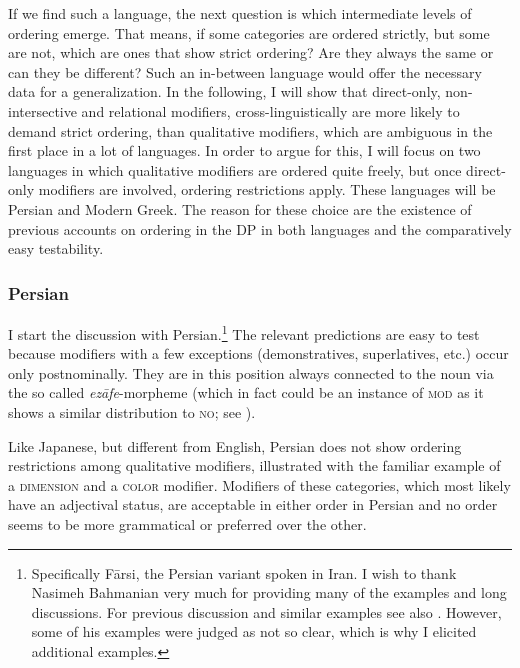 \documentclass [output=book,colorlinks,citecolor=brown]{langscibook}
\begin{document}
If we find such a language, the next question is which intermediate levels of ordering emerge. That means, if some categories are ordered strictly, but some are not, which are ones that show strict ordering? Are they always the same or can they be different? Such an in-between language would offer the necessary data for a generalization. In the following, I will show that direct-only, non-intersective and relational modifiers, cross-linguistically are more likely to demand strict ordering, than qualitative modifiers, which are ambiguous in the first place in a lot of languages. In order to argue for this, I will focus on two languages in which qualitative modifiers are ordered quite freely, but once direct-only modifiers are involved, ordering restrictions apply. These languages will be Persian and Modern Greek. The reason for these choice are the existence of previous accounts on ordering in the DP in both languages and the comparatively easy testability.

\subsubsection{Persian} \label{persiananalysis}

I start the discussion with Persian.\footnote{Specifically Fārsi, the Persian variant spoken in Iran. I wish to thank Nasimeh Bahmanian very much for providing many of the examples and long discussions. For previous discussion and similar examples see also \citet{kahne:2014:revisiting}. However, some of his examples were judged as not so clear, which is why I elicited additional examples.} The relevant predictions are easy to test because modifiers with a few exceptions (demonstratives, superlatives, etc.) occur only postnominally. They are in this position always connected to the noun via the so called \textit{ezāfe}-morpheme (which in fact could be an instance of \textsc{mod} as it shows a similar distribution to \textsc{no}; see \citealt{toosarvandani:2014:the, gn:2024:morpho}). %

Like Japanese, but different from English, Persian does not show ordering restrictions among qualitative modifiers, illustrated with the familiar example of a \textsc{dimension} and a \textsc{color} modifier. Modifiers of these categories, which most likely have an adjectival status, are acceptable in either order in Persian and no order seems to be more grammatical or preferred over the other. %
\end{document}
